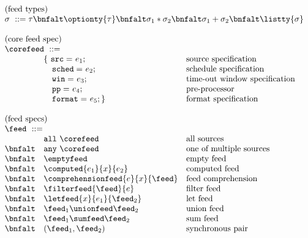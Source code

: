 \begin{figure}[t]
\[
\begin{array}{lll}
\multicolumn{3}{l}{\mbox{(feed types)}}\\ 
\multicolumn{3}{l}{\sigma \ ::= \tau \bnfalt \optionty{\tau} 
  \bnfalt \sigma_1 * \sigma_2
  \bnfalt \sigma_1 + \sigma_2
  \bnfalt \listty{\sigma}
}   \\  
\\
\multicolumn{3}{l}{\mbox{(core feed spec)}}\\ 
\multicolumn{3}{l}{\corefeed \ ::= }\\
& \{ \ \mathtt{src=}\    e_1;    & \mbox{source specification} \\
& \ \ \ \mathtt{sched=}\  e_2;    & \mbox{schedule specification}\\
& \ \ \ \mathtt{win=}\    e_3;    & \mbox{time-out window specification} \\
& \ \ \ \mathtt{pp=}\     e_4;    & \mbox{pre-processor} \\
& \ \ \ \mathtt{format=}\ e_5; \} & \mbox{format specification}\\ 
\\
\multicolumn{3}{l}{\mbox{(feed specs)}}\\ 
\multicolumn{3}{l}{\feed \ ::=}   \\  
         & \mathtt{all}\ \corefeed & \mbox{all sources}\\ 
 \bnfalt & \mathtt{any}\ \corefeed & \mbox{one of multiple sources}\\ 
 \bnfalt & \emptyfeed & \mbox{empty feed} \\
 \bnfalt & \computed{e_1}{x}{e_2} & \mbox{computed feed} \\
 \bnfalt & \comprehensionfeed{e}{x}{\feed} & \mbox{feed comprehension} \\
 \bnfalt & \filterfeed{\feed}{e} & \mbox{filter feed} \\
 \bnfalt & \letfeed{x}{e_1}{\feed_2} & \mbox{let feed} \\
 \bnfalt & \feed_1 \unionfeed \feed_2 & \mbox{union feed} \\
 \bnfalt & \feed_1 \sumfeed \feed_2 & \mbox{sum feed} \\
 \bnfalt & (\feed_1, \feed_2) & \mbox{synchronous pair} \\

\end{array}\]
\end{figure}
